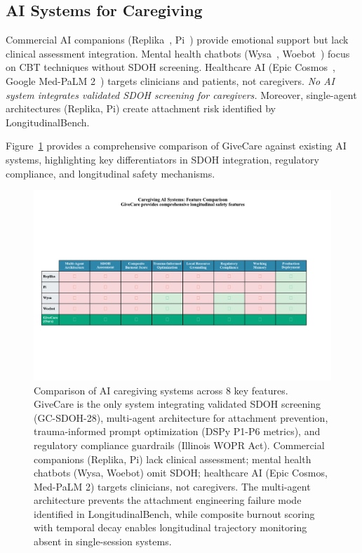 \documentclass{article}%
\begin{document}
%
\subsection{AI Systems for Caregiving}%
\label{subsec:AISystemsforCaregiving}%
Commercial AI companions (Replika~\cite{replika2024}, Pi~\cite{pi2024}) provide emotional support but lack clinical assessment integration. Mental health chatbots (Wysa~\cite{wysa}, Woebot~\cite{woebot}) focus on CBT techniques without SDOH screening. Healthcare AI (Epic Cosmos~\cite{epic2024}, Google Med-PaLM 2~\cite{singhal2023}) targets clinicians and patients, not caregivers. \textit{No AI system integrates validated SDOH screening for caregivers.} Moreover, single-agent architectures (Replika, Pi) create attachment risk identified by LongitudinalBench.

Figure~\ref{fig:comparison} provides a comprehensive comparison of GiveCare against existing AI systems, highlighting key differentiators in SDOH integration, regulatory compliance, and longitudinal safety mechanisms.

\begin{figure}[htbp]
\centering
\includegraphics[width=\textwidth]{fig15_comparison_table.pdf}
\caption{Comparison of AI caregiving systems across 8 key features. GiveCare is the only system integrating validated SDOH screening (GC-SDOH-28), multi-agent architecture for attachment prevention, trauma-informed prompt optimization (DSPy P1-P6 metrics), and regulatory compliance guardrails (Illinois WOPR Act). Commercial companions (Replika, Pi) lack clinical assessment; mental health chatbots (Wysa, Woebot) omit SDOH; healthcare AI (Epic Cosmos, Med-PaLM 2) targets clinicians, not caregivers. The multi-agent architecture prevents the attachment engineering failure mode identified in LongitudinalBench, while composite burnout scoring with temporal decay enables longitudinal trajectory monitoring absent in single-session systems.}
\label{fig:comparison}
\end{figure}
\end{document}
